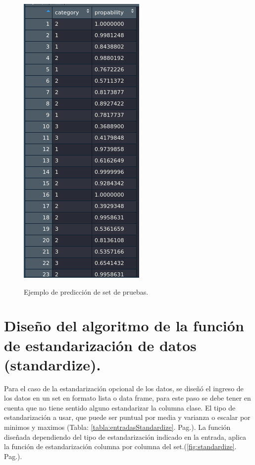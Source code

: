 \begin{figure}[h]
	\caption{Ejemplo de predicción de set de pruebas.}
	\centering
	\includegraphics[scale=0.5]{outputTesting.png}
	\label{fig:outputTesting}
\end{figure}

\section{Diseño del algoritmo de la función de estandarización de datos (standardize).}

	Para el caso de la estandarización opcional de los datos, se diseñó el ingreso de los datos en un set en formato lista o data frame, para este paso se debe tener en cuenta que no tiene sentido alguno estandarizar la columna clase. El tipo de estandarización a usar, que puede ser puntual por media y varianza o escalar por minimos y maximos (Tabla: \ref{tabla:entradasStandardize}. Pag.\pageref{tabla:entradasStandardize}). La función diseñada dependiendo del tipo de estandarización indicado en la entrada, aplica la función de estandarización columna por columna del set.(\ref{fig:standardize}. Pag.\pageref{fig:standardize}).\\
	
